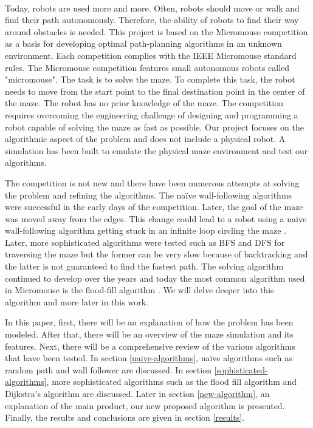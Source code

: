 \documentclass[12pt]{article}
\begin{document}
\paragraph{}
Today, robots are used more and more. Often, robots should move or walk and find their path autonomously.
Therefore, the ability of robots to find their way around obstacles is needed.
This project is based on the \gls{Micromouse} competition as a basis for developing optimal path-planning algorithms in an unknown environment.
Each competition complies with the \gls{IEEE} \gls{Micromouse} standard rules.
The \gls{Micromouse} competition features small autonomous robots called "micromouse".
The task is to solve the \gls{maze}.
To complete this task, the robot needs to move from the start point to the final destination point in the center of the \gls{maze}.
The robot has no prior knowledge of the \gls{maze}.
The competition requires overcoming the engineering challenge of designing and programming a robot capable of solving the \gls{maze} as fast as possible.
Our project focuses on the algorithmic aspect of the problem and does not include a physical robot.
A simulation has been built to emulate the physical \gls{maze} environment and test our algorithms.

The competition is not new and there have been numerous attempts at solving the problem and refining the algorithms.
The na\"{i}ve wall-following algorithms were successful in the early days of the competition.
Later, the goal of the \gls{maze} was moved away from the edges.
This change could lead to a robot using a na\"{i}ve wall-following algorithm getting stuck in an infinite loop circling the \gls{maze} \cite{4725791}.
Later, more sophisticated algorithms were tested such as \gls{BFS} and \gls{DFS} for traversing the \gls{maze} but the former can be very slow because of backtracking and the latter is not guaranteed to find the fastest path.
The solving algorithm continued to develop over the years and today the most common algorithm used in \gls{Micromouse} is the flood-fill algorithm \cite{4725791}.
We will delve deeper into this algorithm and more later in this work.

In this paper, first, there will be an explanation of how the problem has been modeled.
After that, there will be an overview of the \gls{maze} simulation and its features.
Next, there will be a comprehensive review of the various algorithms that have been tested.
In section \ref{naive-algorithms}, na\"{i}ve algorithms such as random path and wall follower are discussed.
In section \ref{sophisticated-algorithms}, more sophisticated algorithms such as the flood fill algorithm and Dijkstra's algorithm are discussed.
Later in section \ref{new-algorithm}, an explanation of the main product, our new proposed algorithm is presented.
Finally, the results and conclusions are given in section \ref{results}.
\end{document}
